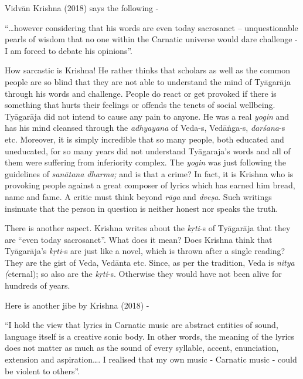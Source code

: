 Vidvān Krishna (2018) says the following -

\begin{myquote}
“…however considering that his words are even today sacrosanct – unquestionable pearls of wisdom that no one within the Carnatic universe would dare challenge - I am forced to debate his opinions”.
\end{myquote}

How sarcastic is Krishna! He rather thinks that scholars as well as the common people are so blind that they are not able to understand the mind of Tyāgarāja through his words and challenge. People do react or get provoked if there is something that hurts their feelings or offends the tenets of social wellbeing. Tyāgarāja did not intend to cause any pain to anyone. He was a real \textit{yogin} and has his mind cleansed through the \textit{adhyayana} of Veda-s, Vedāṅga-s, \textit{darśana}-s etc. Moreover, it is simply incredible that so many people, both educated and uneducated, for so many years did not understand Tyāgaraja’s words and all of them were suffering from inferiority complex. The \textit{yogin} was just following the guidelines of \textit{sanātana dharma;} and is that a crime? In fact, it is Krishna who is provoking people against a great composer of lyrics which has earned him bread, name and fame. A critic must think beyond \textit{rāga} and \textit{dveṣa}. Such writings insinuate that the person in question is neither honest nor speaks the truth. 

There is another aspect. Krishna writes about the \textit{kṛti}-s of Tyāgarāja that they are “even today sacrosanct”. What does it mean? Does Krishna think that Tyāgarāja’s \textit{kṛti}-s are just like a novel, which is thrown after a single reading? They are the gist of Veda, Vedānta etc. Since, as per the tradition, Veda is \textit{nitya (}eternal); so also are the \textit{kṛti}-s. Otherwise they would have not been alive for hundreds of years. 

Here is another jibe by Krishna (2018) -

\begin{myquote}
“I hold the view that lyrics in Carnatic music are abstract entities of sound, language itself is a creative sonic body. In other words, the meaning of the lyrics does not matter as much as the sound of every syllable, accent, enunciation, extension and aspiration…. I realised that my own music - Carnatic music - could be violent to others”.
\end{myquote}

